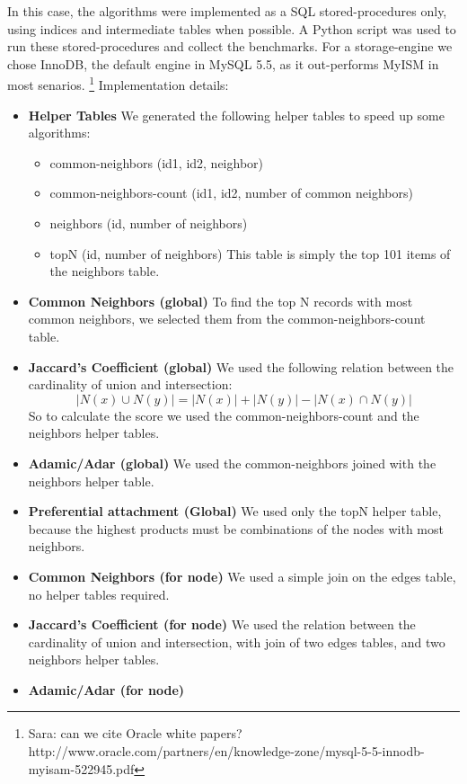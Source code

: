 In this case, the algorithms were implemented as a SQL stored-procedures only,
using indices and intermediate tables when possible. A Python script was used
to run these stored-procedures and collect the benchmarks. For a storage-engine 
we chose InnoDB, the default engine in MySQL 5.5, as it out-performs MyISM in 
most senarios. \footnote{Sara: can we cite Oracle white papers? 
http://www.oracle.com/partners/en/knowledge-zone/mysql-5-5-innodb-myisam-522945.pdf}
\linebreak
Implementation details:
\begin{itemize}
	\item {\bf Helper Tables} We generated the following helper tables 
		to speed up some algorithms:
		\begin{itemize}
			\item {common-neighbors (id1, id2, neighbor)}
			\item {common-neighbors-count (id1, id2, number of common neighbors)}
			\item {neighbors (id, number of neighbors)}
			\item {topN (id, number of neighbors)}
				This table is simply the top 101 items of the neighbors table.
		\end{itemize}
	\item {\bf Common Neighbors (global)} 
		To find the top N records with most common neighbors, 
		we selected them from the common-neighbors-count table.
	\item {\bf Jaccard's Coefficient (global)} 
		We used the following relation between the cardinality of union and intersection:
		\[{|N(x) \cup N(y)|} = {|N(x)| + |N(y)| - |N(x) \cap N(y)|}\]
		So to calculate the score we used the common-neighbors-count and the neighbors helper tables.
	\item {\bf Adamic/Adar (global)} 
		We used the common-neighbors joined with the neighbors helper table.
	\item {\bf Preferential attachment (Global)}
		We used only the topN helper table, because the highest products 
		must be combinations of the nodes with most neighbors.
	\item {\bf Common Neighbors (for node)}
		We used a simple join on the edges table, no helper tables required.
	\item {\bf Jaccard's Coefficient (for node)}
		We used the relation between the cardinality of union and intersection,
		with join of two edges tables, and two neighbors helper tables.
	\item {\bf Adamic/Adar (for node)}

\end{itemize}
